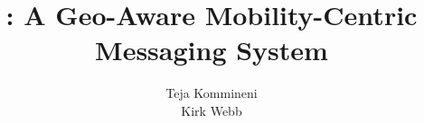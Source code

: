 \documentclass[letterpaper,twocolumn,10pt]{sig-alternate-10pt}
\title{\name{}: A Geo-Aware Mobility-Centric Messaging System}
\author{
  \alignauthor Teja Kommineni\\
  \affaddr{teja.kommineni@utah.edu}
  \alignauthor Kirk Webb\\
  \affaddr{kwebb@cs.utah.edu}
  \sharedaffiliation
  \affaddr{School of Computing}\\
  \affaddr{University of Utah}\\
  \affaddr{50 S. Central Campus Drive}\\
  \affaddr{Salt Lake City, UT - 84112}
}
\begin{document}
\maketitle










%


{
  \small 
  
  
}
\end{document}
